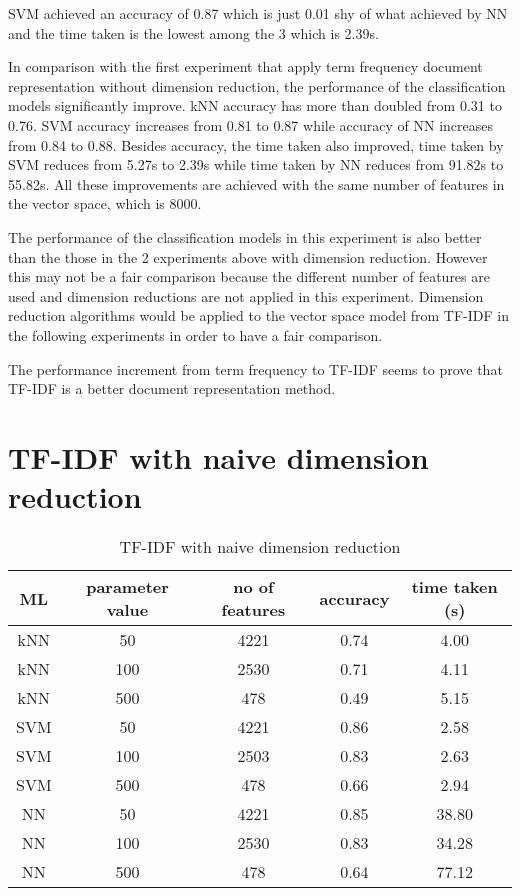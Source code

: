 SVM achieved an accuracy of 0.87 which is just 0.01 shy of what achieved by NN and the time taken is the lowest among the 3 which is 2.39s.

In comparison with the first experiment that apply term frequency document representation without dimension reduction, the performance of the classification models significantly improve. kNN accuracy has more than doubled from 0.31 to 0.76. SVM accuracy increases from 0.81 to 0.87 while accuracy of NN increases from  0.84 to 0.88. Besides accuracy, the time taken also improved, time taken by SVM reduces from 5.27s to 2.39s while time taken by NN reduces from 91.82s to 55.82s. All these improvements are achieved with the same number of features in the vector space, which is 8000. 

The performance of the classification models in this experiment is also better than the those in the 2 experiments above with dimension reduction. However this may not be a fair comparison because the different number of features are used and dimension reductions are not applied in this experiment. Dimension reduction algorithms would be applied to the vector space model from TF-IDF in the following experiments in order to have a fair comparison.

The performance increment from term frequency to TF-IDF seems to prove that TF-IDF is a better document representation method.\\

\clearpage
\section{TF-IDF with naive dimension reduction}

\begin{table} [ht]
	\centering
	\begin{tabular}{|| c | c | c | c | c||}
		\hline
		ML & parameter value & no of features & accuracy & time taken (s) \\ [0.5ex]
		\hline\hline
		kNN & 50 & 4221 & 0.74 & 4.00 \\ 
		\hline
		kNN & 100 & 2530 & 0.71 & 4.11 \\ 
		\hline
		kNN & 500 & 478 & 0.49 & 5.15 \\ 
		\hline\hline
		SVM & 50 & 4221 & 0.86 & 2.58 \\
		\hline
		SVM & 100 & 2503 & 0.83 & 2.63 \\
		\hline
		SVM & 500 & 478 & 0.66 & 2.94 \\
		\hline\hline
		NN & 50 & 4221 & 0.85 & 38.80 \\
		\hline
		NN & 100 & 2530 & 0.83 & 34.28 \\
		\hline
		NN & 500 & 478 & 0.64 & 77.12 \\
		\hline
	\end{tabular}
\caption{TF-IDF with naive dimension reduction}
\label{tbl:tfidfNaive}
\end{table}

